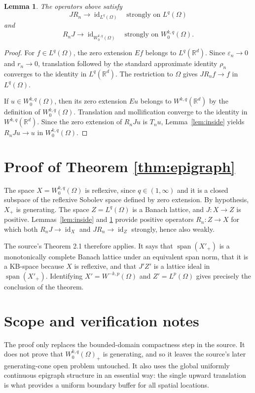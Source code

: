 \documentclass[11pt]{amsart}
\newtheorem{lemma}{Lemma}
\newcommand{\R}{\mathbb R}
\newcommand{\id}{\operatorname{id}}
\newcommand{\Span}{\operatorname{span}}
\begin{document}
\begin{lemma}
\label{lem:convergence}
The operators above satisfy
\[
 JR_n\to \id_{L^q(\Omega)} \quad\text{strongly on } L^q(\Omega)
\]
and
\[
 R_nJ\to \id_{W^{k,q}_0(\Omega)}
 \quad\text{strongly on } W^{k,q}_0(\Omega).
\]
\end{lemma}

\begin{proof}
For $f\in L^q(\Omega)$, the zero extension $Ef$ belongs to $L^q(\R^d)$.  Since
$\varepsilon_n\to0$ and $r_n\to0$, translation followed by the standard
approximate identity $\rho_n$ converges to the identity in $L^q(\R^d)$.  The
restriction to $\Omega$ gives $JR_nf\to f$ in $L^q(\Omega)$.

If $u\in W^{k,q}_0(\Omega)$, then its zero extension $Eu$ belongs to
$W^{k,q}(\R^d)$ by the definition of $W^{k,q}_0(\Omega)$.  Translation and
mollification converge to the identity in $W^{k,q}(\R^d)$.  Since the zero
extension of $R_nJu$ is $T_nu$, Lemma~\ref{lem:inside} yields
$R_nJu\to u$ in $W^{k,q}_0(\Omega)$.
\end{proof}

\section*{Proof of Theorem \ref{thm:epigraph}}

The space $X=W^{k,q}_0(\Omega)$ is reflexive, since $q\in(1,\infty)$ and it is
a closed subspace of the reflexive Sobolev space defined by zero extension.
By hypothesis, $X_+$ is generating.  The space $Z=L^q(\Omega)$ is a Banach
lattice, and $J:X\to Z$ is positive.  Lemmas~\ref{lem:inside} and
\ref{lem:convergence} provide positive operators $R_n:Z\to X$ for which both
$R_nJ\to\id_X$ and $JR_n\to\id_Z$ strongly, hence also weakly.

The source's Theorem 2.1 therefore applies.  It says that
$\Span(X'_+)$ is a monotonically complete Banach lattice under an equivalent
span norm, that it is a KB-space because $X$ is reflexive, and that
$J'Z'$ is a lattice ideal in $\Span(X'_+)$.  Identifying
$X'=W^{-k,p}(\Omega)$ and $Z'=L^p(\Omega)$ gives precisely the conclusion of
the theorem.

\section*{Scope and verification notes}

The proof only replaces the bounded-domain compactness step in the source.  It
does not prove that $W^{k,q}_0(\Omega)_+$ is generating, and so it leaves the
source's later generating-cone open problem untouched.  It also uses the
global uniformly continuous epigraph structure in an essential way: the single
upward translation is what provides a uniform boundary buffer for all spatial
locations.
\end{document}
